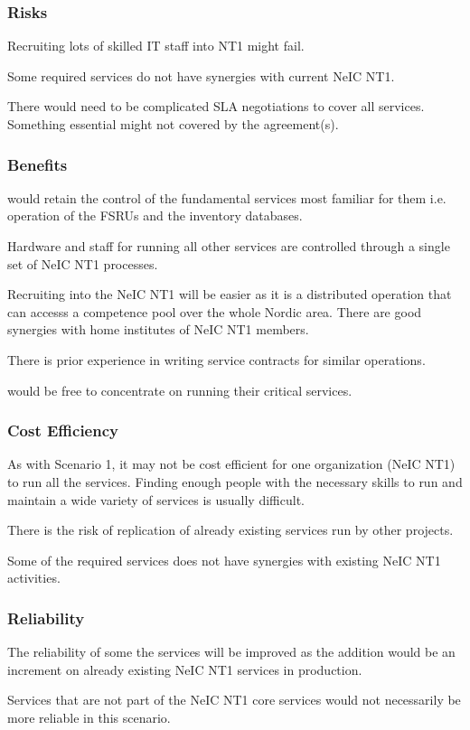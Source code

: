 \documentclass[12pt,a4paper]{article}
\newcommand{\nnt}{NeIC NT1\xspace}
\begin{document}
\subsubsection*{Risks}
\bitm
\item Recruiting lots of skilled IT staff into NT1 might fail.
\item Some \ED required services do not have synergies with current \nnt.
\item There would need to be complicated SLA negotiations to cover all services.
  Something essential might not covered by the agreement(s).
\eitm

\subsubsection*{Benefits}
\bitm
\item \EC would retain the control of the fundamental services most familiar for them i.e. operation of the FSRUs and the inventory databases.
\item Hardware and staff for running all other services are controlled through a single set of \nnt processes.
\item Recruiting into the \nnt will be easier as it is a distributed operation that can accesss a competence pool over the
  whole Nordic area. There are good synergies with home institutes of \nnt members.
\item There is prior experience in writing service contracts for similar operations.
\item \EC would be free to concentrate on running their critical services.
\eitm

\subsubsection*{Cost Efficiency}
\bitm
\item As with Scenario 1, it may not be cost efficient for one organization (\nnt) to run all the services.
  Finding enough people with the necessary skills to run and maintain a wide variety of services is usually difficult.
\item There is the risk of replication of already existing services run by other \einfra projects.
\item Some of the required \ED services does not have synergies with existing \nnt activities.
\eitm

\subsubsection*{Reliability}
\bitm
\item The reliability of some the services will be improved as the \ED addition would be an increment
  on already existing \nnt services in production.
\item Services that are not part of the \nnt core services would not necessarily be more reliable in this scenario.
\eitm
\end{document}
